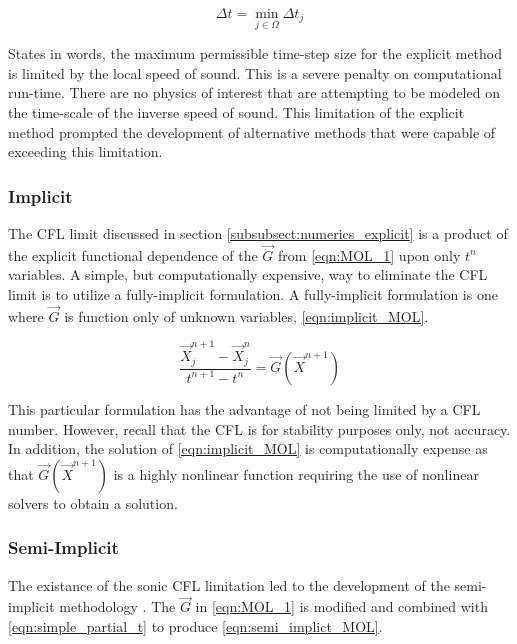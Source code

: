 \begin{equation}
\label{eqn:global_cfl}
\Delta t = \min_{j \in \Omega} \Delta t_j
\end{equation}

States in words, the maximum permissible time-step size for the explicit method is limited by the local speed of sound.
This is a severe penalty on computational run-time.
There are no physics of interest that are attempting to be modeled on the time-scale of the inverse speed of sound.
This limitation of the explicit method prompted the development of alternative methods that were capable of exceeding this limitation.

\subsubsection{Implicit}
\label{subsubsect:numerics_fully_implicit}
The CFL limit discussed in section \ref{subsubsect:numerics_explicit} is a product of the explicit functional dependence of the $\vec{G}$ from \eqref{eqn:MOL_1} upon only $t^n$ variables.
A simple, but computationally expensive, way to eliminate the CFL limit is to utilize a fully-implicit formulation.
A fully-implicit formulation is one where $\vec{G}$ is function only of unknown variables, \eqref{eqn:implicit_MOL}.

\begin{equation}
\label{eqn:implicit_MOL}
\frac{ \vec{X}^{n+1}_{j} - \vec{X}^{n}_{j}}{t^{n+1}-t^{n}} = \vec{G}(\vec{X}^{n+1})
\end{equation}

This particular formulation has the advantage of not being limited by a CFL number.
However, recall that the CFL is for stability purposes only, not accuracy.
In addition, the solution of \eqref{eqn:implicit_MOL} is computationally expense as that $\vec{G}(\vec{X}^{n+1})$ is a highly nonlinear function requiring the use of nonlinear solvers to obtain a solution.

\subsubsection{Semi-Implicit}
\label{subsubsect:numerics_semi_implicit}

The existance of the sonic CFL limitation led to the development of the semi-implicit methodology \cite{Liles1978}.
The $\vec{G}$ in \eqref{eqn:MOL_1} is modified and combined with \eqref{eqn:simple_partial_t} to produce \eqref{eqn:semi_implict_MOL}.


